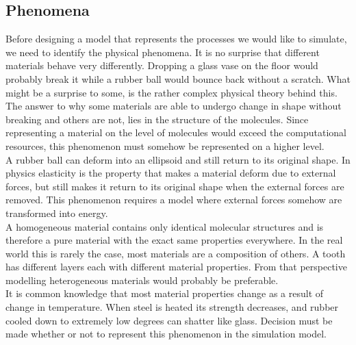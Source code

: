 \subsection{Phenomena}
Before designing a model that represents the processes
we would like to simulate, we need to identify the physical
phenomena. 
It is no surprise that different materials behave very
differently. Dropping a glass vase on the floor would probably break
it while a rubber ball would bounce back without a scratch. What might
be a surprise to some, is the rather complex physical theory behind
this. The answer to why some materials are able to undergo change in shape without
breaking and others are not, lies in the structure of the
molecules. Since representing a material on the level of molecules
would exceed the computational resources, this phenomenon must somehow be
represented on a higher level.  \\

A rubber ball can deform into an ellipsoid and still return to its
original shape. In physics elasticity is the property that
makes a material deform due to external forces, but still makes it
return to its original shape when the external forces are removed. This
phenomenon requires a model where external forces somehow are transformed into
energy. \\



A homogeneous material contains only identical molecular structures
and is therefore a pure material with the exact same properties
everywhere. In the real world this is rarely the case, most materials are a
composition of others. A tooth has different layers each
with different material properties. From that perspective modelling
heterogeneous materials would probably be preferable. \\

It is common knowledge that most material properties change as a
result of change in temperature. When steel is heated its strength
decreases, and rubber cooled down to extremely low degrees can shatter
like glass. Decision must be made whether or not to represent this
phenomenon in the simulation model. \\  

